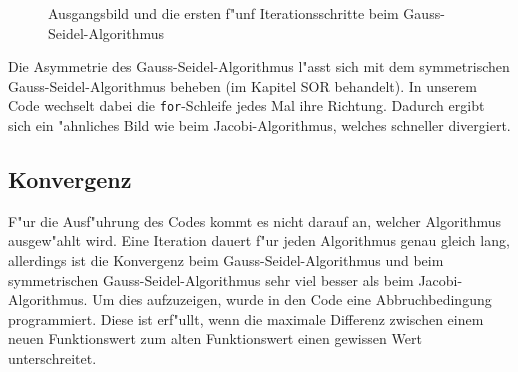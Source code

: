 \begin{refsection}
\begin{figure}
\centering 
{}\quad 
{}\quad 
{} 
\caption{Ausgangsbild und die ersten f"unf Iterationsschritte beim
Gauss-Seidel-Algorithmus\label{potential:gaussseidel}} 
\end{figure}

Die Asymmetrie des Gauss-Seidel-Algorithmus l"asst
sich mit dem symmetrischen Gauss-Seidel-Algorithmus beheben
(im Kapitel SOR behandelt). In unserem Code wechselt dabei die
\texttt{for}-Schleife jedes Mal ihre Richtung. Dadurch ergibt
sich ein "ahnliches Bild wie beim Jacobi-Algorithmus, welches
schneller divergiert. 


\subsection{Konvergenz}
F"ur die Ausf"uhrung des Codes kommt es nicht darauf an, welcher
Algorithmus ausgew"ahlt wird. Eine Iteration dauert f"ur jeden
Algorithmus genau gleich lang, allerdings ist die Konvergenz beim
Gauss-Seidel-Algorithmus und beim symmetrischen Gauss-Seidel-Algorithmus
sehr viel besser als beim Jacobi-Algorithmus. Um dies aufzuzeigen,
wurde in den Code eine Abbruchbedingung programmiert. Diese ist erf"ullt,
wenn die maximale Differenz zwischen einem neuen Funktionswert zum alten
Funktionswert einen gewissen Wert unterschreitet.


\end{refsection}
